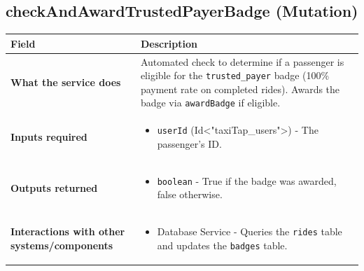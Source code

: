 \documentclass[11pt,a4paper]{article}
\begin{document}
\subsection{checkAndAwardTrustedPayerBadge (Mutation)}
\label{sub:checkAndAwardTrustedPayerBadge}
\begin{longtable}{|p{4cm}|p{12cm}|}
\hline
\textbf{Field} & \textbf{Description} \\
\hline
\textbf{What the service does} & 
Automated check to determine if a passenger is eligible for the \texttt{trusted\_payer} badge (100\% payment rate on completed rides). Awards the badge via \texttt{awardBadge} if eligible. \\
\hline
\textbf{Inputs required} & 
\begin{itemize}[nosep]
\item \texttt{userId} (Id<"taxiTap\_users">) - The passenger's ID.
\end{itemize} \\
\hline
\textbf{Outputs returned} & 
\begin{itemize}[nosep]
\item \texttt{boolean} - True if the badge was awarded, false otherwise.
\end{itemize} \\
\hline
\textbf{Interactions with other systems/components} & 
\begin{itemize}[nosep]
\item Database Service - Queries the \texttt{rides} table and updates the \texttt{badges} table.
\end{itemize} \\
\hline
\end{longtable}
\end{document}
